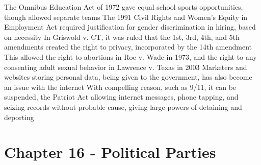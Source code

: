 \documentclass[11 pt, twoside]{article}
\newenvironment{outline*}
{
	\begin{outline}[enumerate]
	}
	{\end{outline}
}
\begin{document}
\begin{outline*}
\2 The Omnibus Education Act of 1972 gave equal school sports opportunities, though allowed separate teams
\2 The 1991 Civil Rights and Women’s Equity in Employment Act required justification for gender discrimination in hiring, based on necessity
\1 In Griswold v. CT, it was ruled that the 1st, 3rd, 4th, and 5th amendments created the right to privacy, incorporated by the 14th amendment
\2 This allowed the right to abortions in Roe v. Wade in 1973, and the right to any consenting adult sexual behavior in Lawrence v. Texas in 2003
\2 Marketers and websites storing personal data, being given to the government, has also become an issue with the internet
\2 With compelling reason, such as 9/11, it can be suspended, the Patriot Act allowing internet messages, phone tapping, and seizing records without probable cause, giving large powers of detaining and deporting
\end{outline*}
\section{Chapter 16 - Political Parties}
\end{document}
